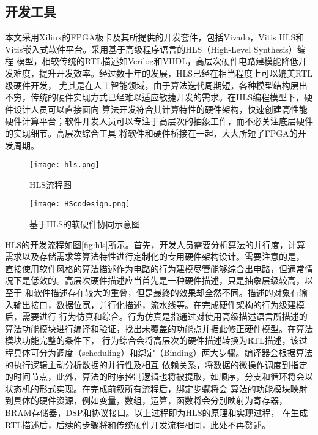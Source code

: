 \subsection{开发工具}
本文采用Xilinx的FPGA板卡及其所提供的开发套件，包括Vivado，Vitis HLS和Vitis嵌入式软件平台。采用基于高级程序语言的HLS（High-Level Synthesis）编程
模型，相较传统的RTL描述如Verilog和VHDL，高层次硬件电路建模能降低开发难度，提升开发效率。经过数十年的发展，HLS已经在相当程度上可以媲美RTL级硬件开发，
尤其是在人工智能领域，由于算法迭代周期短，各种模型结构层出不穷，传统的硬件实现方式已经难以适应敏捷开发的需求。在HLS编程模型下，硬件设计人员可以直接面向
算法开发符合其计算特性的硬件架构，快速创建高性能硬件计算平台；软件开发人员可以专注于高层次的抽象工作，而不必关注底层硬件的实现细节。高层次综合工具
将软件和硬件桥接在一起，大大所短了FPGA的开发周期。
\begin{figure}
	\centering
	\begin{minipage}[t]{0.48\textwidth}
		\centering
		\texttt{[image: hls.png]}
		\caption{HLS流程图}
		\label{fig:hls}
	\end{minipage}
	\begin{minipage}[t]{0.48\textwidth}
		\centering
		\texttt{[image: HScodesign.png]}
		\caption{基于HLS的软硬件协同示意图}
		\label{fig:hlscodesign}
	\end{minipage}
\end{figure}

HLS的开发流程如图\ref{fig:hls}所示。首先，开发人员需要分析算法的并行度，计算需求以及存储需求等算法特性进行定制化的专用硬件架构设计。需要注意的是，
直接使用软件风格的算法描述作为电路的行为建模尽管能够综合出电路，但通常情况下是低效的。高层次硬件描述应当首先是一种硬件描述，只是抽象层级较高，以至于
和软件描述存在较大的重叠，但是最终的效果却全然不同。描述的对象有输入输出接口，数据位宽，并行化描述，流水线等。在完成硬件架构的行为级建模后，需要进行
行为仿真和综合。行为仿真是指通过对使用高级描述语言所描述的算法功能模块进行编译和验证，找出未覆盖的功能点并据此修正硬件模型。在算法模块功能完整的条件下，
行为综合会将高层次的硬件描述转换为RTL描述，该过程具体可分为调度（scheduling）和绑定（Binding）两大步骤。编译器会根据算法的执行逻辑主动分析数据的并行性及相互
依赖关系，将数据的微操作调度到指定的时间节点，此外，算法的时序控制逻辑也将被提取，如顺序，分支和循环将会以状态机的形式实现。在完成前叙所有流程后，绑定步骤将会
算法的功能模块映射到具体的硬件资源，例如变量，数组，运算，函数将会分别映射为寄存器，BRAM存储器，DSP和协议接口。以上过程即为HLS的原理和实现过程，
在生成RTL描述后，后续的步骤将和传统硬件开发流程相同，此处不再赘述。

